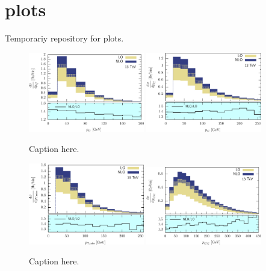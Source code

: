 \documentclass[preprint]{JHEP3} %
\begin{document}
\appendix
\section{plots}
Temporariy repository for plots.


\begin{figure}[h]
\centering %
\includegraphics[width=0.45\textwidth]{./LHC_53_Fig01.eps}
\hfill
\includegraphics[width=0.45\textwidth]{./LHC_53_Fig03.eps}
\caption{\label{fig:i} Caption here.}
\end{figure}


\begin{figure}[h]
\centering %
\includegraphics[width=0.45\textwidth]{./LHC_53_Fig08.eps}
\hfill
\includegraphics[width=0.45\textwidth]{./LHC_53_Fig12.eps}
\caption{\label{fig:i} Caption here.}
\end{figure}
\end{document}
